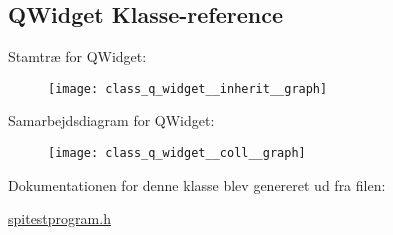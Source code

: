 \hypertarget{class_q_widget}{}\subsection{Q\+Widget Klasse-\/reference}
\label{class_q_widget}


Stamtræ for Q\+Widget\+:
\nopagebreak
\begin{figure}[H]
\begin{center}
\leavevmode
\texttt{[image: class\_q\_widget\_\_inherit\_\_graph]}
\end{center}
\end{figure}


Samarbejdsdiagram for Q\+Widget\+:
\nopagebreak
\begin{figure}[H]
\begin{center}
\leavevmode
\texttt{[image: class\_q\_widget\_\_coll\_\_graph]}
\end{center}
\end{figure}


Dokumentationen for denne klasse blev genereret ud fra filen\+:\begin{DoxyCompactItemize}
\item 
\hyperlink{spitestprogram_8h}{spitestprogram.\+h}\end{DoxyCompactItemize}
